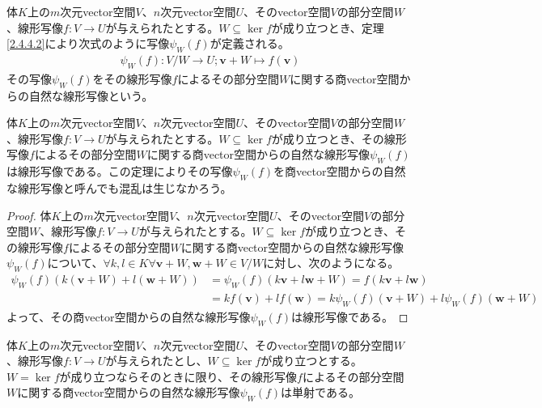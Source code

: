 \documentclass[dvipdfmx]{jsarticle}
\begin{document}
\begin{dfn}
体$K$上の$m$次元vector空間$V$、$n$次元vector空間$U$、そのvector空間$V$の部分空間$W$、線形写像$f:V \rightarrow U$が与えられたとする。$W \subseteq \ker f$が成り立つとき、定理\ref{2.4.4.2}により次式のように写像$\psi_{W}(f)$が定義される。
\begin{align*}
\psi_{W}(f):{V}/{W} \rightarrow U;\mathbf{v} + W \mapsto f\left( \mathbf{v} \right)
\end{align*}
その写像$\psi_{W}(f)$をその線形写像$f$によるその部分空間$W$に関する商vector空間からの自然な線形写像という。
\end{dfn}
\begin{thm}\label{2.4.4.3}
体$K$上の$m$次元vector空間$V$、$n$次元vector空間$U$、そのvector空間$V$の部分空間$W$、線形写像$f:V \rightarrow U$が与えられたとする。$W \subseteq \ker f$が成り立つとき、その線形写像$f$によるその部分空間$W$に関する商vector空間からの自然な線形写像$\psi_{W}(f)$は線形写像である。この定理によりその写像$\psi_{W}(f)$を商vector空間からの自然な線形写像と呼んでも混乱は生じなかろう。
\end{thm}
\begin{proof}
体$K$上の$m$次元vector空間$V$、$n$次元vector空間$U$、そのvector空間$V$の部分空間$W$、線形写像$f:V \rightarrow U$が与えられたとする。$W \subseteq \ker f$が成り立つとき、その線形写像$f$によるその部分空間$W$に関する商vector空間からの自然な線形写像$\psi_{W}(f)$について、$\forall k,l \in K\forall\mathbf{v} + W,\mathbf{w} + W \in {V}/{W}$に対し、次のようになる。
\begin{align*}
\psi_{W}(f)\left( k\left( \mathbf{v} + W \right) + l\left( \mathbf{w} + W \right) \right) &= \psi_{W}(f)\left( k\mathbf{v} + l\mathbf{w} + W \right) = f\left( k\mathbf{v} + l\mathbf{w} \right)\\
&= kf\left( \mathbf{v} \right) + lf\left( \mathbf{w} \right) = k\psi_{W}(f)\left( \mathbf{v} + W \right) + l\psi_{W}(f)\left( \mathbf{w} + W \right)
\end{align*}
よって、その商vector空間からの自然な線形写像$\psi_{W}(f)$は線形写像である。
\end{proof}
\begin{thm}\label{2.4.4.4}
体$K$上の$m$次元vector空間$V$、$n$次元vector空間$U$、そのvector空間$V$の部分空間$W$、線形写像$f:V \rightarrow U$が与えられたとし、$W \subseteq \ker f$が成り立つとする。$W = \ker f$が成り立つならそのときに限り、その線形写像$f$によるその部分空間$W$に関する商vector空間からの自然な線形写像$\psi_{W}(f)$は単射である。
\end{thm}
\end{document}
